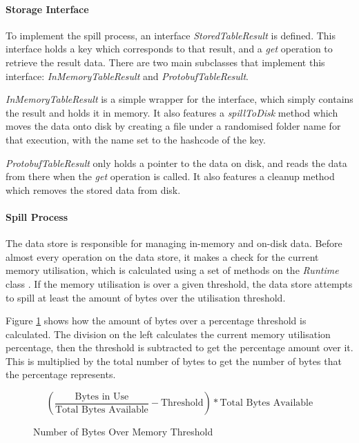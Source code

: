 \paragraph{Storage Interface}
To implement the spill process, an interface \textit{StoredTableResult} is defined. This interface holds a key which corresponds to that result, and a \textit{get} operation to retrieve the result data. There are two main subclasses that implement this interface: \textit{InMemoryTableResult} and \textit{ProtobufTableResult}. 

\textit{InMemoryTableResult} is a simple wrapper for the interface, which simply contains the result and holds it in memory. It also features a \textit{spillToDisk} method which moves the data onto disk by creating a file under a randomised folder name for that execution, with the name set to the hashcode of the key. 

\textit{ProtobufTableResult} only holds a pointer to the data on disk, and reads the data from there when the \textit{get} operation is called. It also features a cleanup method which removes the stored data from disk.

\paragraph{Spill Process}
The data store is responsible for managing in-memory and on-disk data. Before almost every operation on the data store, it makes a check for the current memory utilisation, which is calculated using a set of methods on the \textit{Runtime} class \cite{javaruntimeclass}. If the memory utilisation is over a given threshold, the data store attempts to spill at least the amount of bytes over the utilisation threshold. 

Figure \ref{fig:bytes-over-memory-threshold} shows how the amount of bytes over a percentage threshold is calculated. The division on the left calculates the current memory utilisation percentage, then the threshold is subtracted to get the percentage amount over it. This is multiplied by the total number of bytes to get the number of bytes that the percentage represents.

\begin{figure}[h]
	\centering
	\[ \left( \frac{\text{Bytes in Use}}{\text{Total Bytes Available}} - \text{Threshold} \right) * \text{Total Bytes Available} \]
	\caption{Number of Bytes Over Memory Threshold}
	\label{fig:bytes-over-memory-threshold}
\end{figure}


